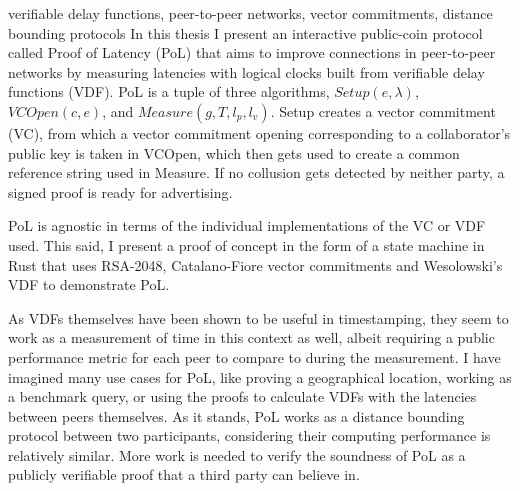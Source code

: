 \begin{itabstract}{verifiable delay functions, peer-to-peer networks, vector commitments, distance bounding protocols}
	In this thesis I present an interactive public-coin protocol called Proof of Latency (PoL) that aims to improve connections in peer-to-peer networks by measuring latencies with logical clocks built from verifiable delay functions (VDF). PoL is a tuple of three algorithms, \(Setup(e, \lambda)\), \(VCOpen(c, e)\), and \(Measure(g, T, l_p, l_v)\). Setup creates a vector commitment (VC), from which a vector commitment opening corresponding to a collaborator's public key is taken in VCOpen, which then gets used to create a common reference string used in Measure. If no collusion gets detected by neither party, a signed proof is ready for advertising.
	
	PoL is agnostic in terms of the individual implementations of the VC or VDF used. This said, I present a proof of concept in the form of a state machine in Rust that uses RSA-2048, Catalano-Fiore vector commitments and Wesolowski's VDF to demonstrate PoL.
	
	As VDFs themselves have been shown to be useful in timestamping, they seem to work as a measurement of time in this context as well, albeit requiring a public performance metric for each peer to compare to during the measurement. I have imagined many use cases for PoL, like proving a geographical location, working as a benchmark query, or using the proofs to calculate VDFs with the latencies between peers themselves.
	As it stands, PoL works as a distance bounding protocol between two participants, considering their computing performance is relatively similar. More work is needed to verify the soundness of PoL as a publicly verifiable proof that a third party can believe in.
\end{itabstract}
